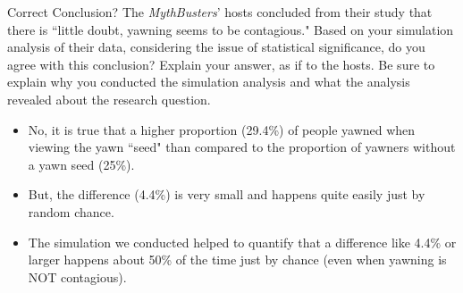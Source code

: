 \documentclass[13pt]{beamer}
\newenvironment{stepitemize}{\begin{itemize}[<+->]}{\end{itemize} }
\begin{document}
\begin{frame}{Correct Conclusion?}
The \textit{MythBusters}' hosts concluded from their study that there is ``little doubt, yawning seems to be contagious." Based on your simulation analysis of their data, considering the issue of statistical significance, do you agree with this conclusion? Explain your answer, as if to the hosts. Be sure to explain why you conducted the simulation analysis and what the analysis revealed about the research question. \pause
\begin{stepitemize}
	\item No, it is true that a higher proportion (29.4\%) of people yawned when viewing the yawn ``seed" than compared to the proportion of yawners without a yawn seed (25\%).
	\item But, the difference (4.4\%) is very small and happens quite easily just by random chance. \pause
	\item The simulation we conducted helped to quantify that a difference like 4.4\% or larger happens about 50\% of the time just by chance (even when yawning is NOT contagious).
\end{stepitemize}
\end{frame}
\end{document}

